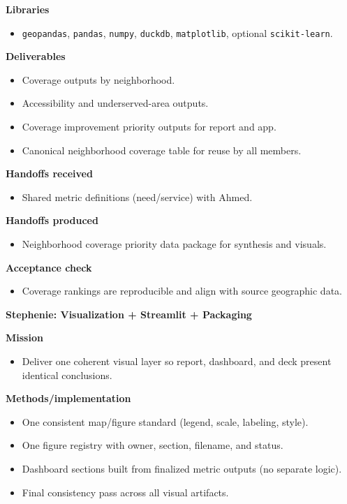 \documentclass[10pt,letterpaper,twocolumn]{article}
\newcommand{\subhead}[1]{\textbf{#1}}
\begin{document}
\subhead{Libraries}
\begin{itemize}
  \item \texttt{geopandas}, \texttt{pandas}, \texttt{numpy}, \texttt{duckdb}, \texttt{matplotlib}, optional \texttt{scikit-learn}.
\end{itemize}

\subhead{Deliverables}
\begin{itemize}
  \item Coverage outputs by neighborhood.
  \item Accessibility and underserved-area outputs.
  \item Coverage improvement priority outputs for report and app.
  \item Canonical neighborhood coverage table for reuse by all members.
\end{itemize}

\subhead{Handoffs received}
\begin{itemize}
  \item Shared metric definitions (need/service) with Ahmed.
\end{itemize}

\subhead{Handoffs produced}
\begin{itemize}
  \item Neighborhood coverage priority data package for synthesis and visuals.
\end{itemize}

\subhead{Acceptance check}
\begin{itemize}
  \item Coverage rankings are reproducible and align with source geographic data.
\end{itemize}

\vspace{0.4em}
\subhead{Stephenie: Visualization + Streamlit + Packaging}

\subhead{Mission}
\begin{itemize}
  \item Deliver one coherent visual layer so report, dashboard, and deck present identical conclusions.
\end{itemize}

\subhead{Methods/implementation}
\begin{itemize}
  \item One consistent map/figure standard (legend, scale, labeling, style).
  \item One figure registry with owner, section, filename, and status.
  \item Dashboard sections built from finalized metric outputs (no separate logic).
  \item Final consistency pass across all visual artifacts.
\end{itemize}
\end{document}
